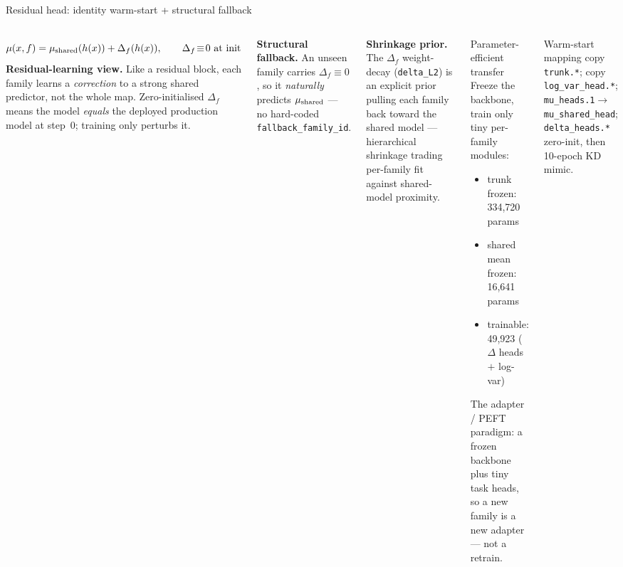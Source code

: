 \documentclass[UTF8,aspectratio=169]{ctexbeamer}
\newcommand{\good}[1]{\textcolor{green!45!black}{#1}}
\begin{document}
\begin{frame}{Residual head: identity warm-start + structural fallback}
\small
\begin{columns}[T]
\[
  \mu(x,f) = \mu_{\rm shared}(h(x)) + \Delta_f(h(x)),\qquad \Delta_f\!\equiv\!0\ \text{at init}
\]
\textbf{Residual-learning view.} Like a residual block, each family learns a
\emph{correction} to a strong shared predictor, not the whole map. Zero-initialised
$\Delta_f$ means the model \emph{equals} the deployed production model at step~0;
training only perturbs it.

\vspace{0.25em}
\textbf{Structural fallback.} An unseen family carries $\Delta_f\equiv 0$, so it
\emph{naturally} predicts $\mu_{\rm shared}$ --- no hard-coded
\texttt{fallback\_family\_id}.

\vspace{0.25em}
\textbf{Shrinkage prior.} The $\Delta_f$ weight-decay (\texttt{delta\_L2}) is an
explicit prior pulling each family back toward the shared model --- hierarchical
shrinkage trading per-family fit against shared-model proximity.

\footnotesize
\begin{block}{Parameter-efficient transfer}
Freeze the backbone, train only tiny per-family modules:
\begin{itemize}\setlength\itemsep{1pt}
  \item trunk frozen: 334{,}720 params
  \item shared mean frozen: 16{,}641 params
  \item \good{trainable: 49{,}923} ($\Delta$ heads $+$ log-var)
\end{itemize}
The adapter / PEFT paradigm: a frozen backbone plus tiny task heads, so a new
family is a new adapter --- not a retrain.
\end{block}

\begin{block}{Warm-start mapping}
\scriptsize
copy \texttt{trunk.*}; copy \texttt{log\_var\_head.*};
\texttt{mu\_heads.1}$\to$\texttt{mu\_shared\_head};
\texttt{delta\_heads.*} zero-init, then 10-epoch KD mimic.
\end{block}
\end{columns}
\end{frame}
\end{document}
